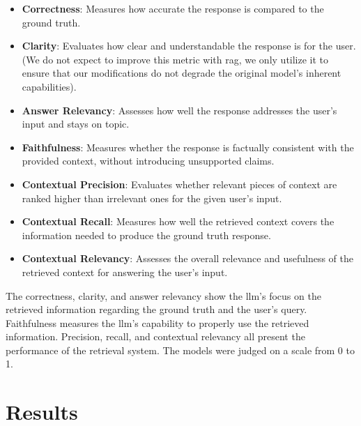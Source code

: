 \documentclass[fleqn,moreauthors,10pt]{ds_report}
\begin{document}
\begin{itemize}
\setlength\itemsep{-0.3em}
    \item \textbf{Correctness}: Measures how accurate the response is compared to the ground truth.

    \item \textbf{Clarity}: Evaluates how clear and understandable the response is for the user. (We do not expect to improve this metric with \ac{rag}, we only utilize it to ensure that our modifications do not degrade the original model's inherent capabilities).
    
    \item \textbf{Answer Relevancy}: Assesses how well the response addresses the user's input and stays on topic.
    
    \item \textbf{Faithfulness}: Measures whether the response is factually consistent with the provided context, without introducing unsupported claims.
    
    \item \textbf{Contextual Precision}: Evaluates whether relevant pieces of context are ranked higher than irrelevant ones for the given user's input.
    
    \item \textbf{Contextual Recall}: Measures how well the retrieved context covers the information needed to produce the ground truth response.
    
    \item \textbf{Contextual Relevancy}: Assesses the overall relevance and usefulness of the retrieved context for answering the user's input.

\end{itemize} 

The correctness, clarity, and answer relevancy show the \ac{llm}'s focus on the retrieved information regarding the ground truth and the user's query. Faithfulness measures the \ac{llm}'s capability to properly use the retrieved information. Precision, recall, and contextual relevancy all present the performance of the retrieval system. The models were judged on a scale from 0 to 1. 

\section*{Results}
\end{document}
